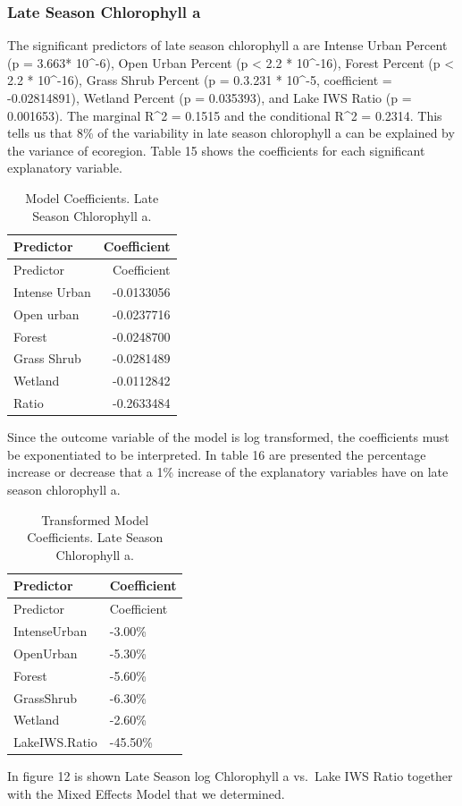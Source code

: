 \documentclass[12pt,]{article}
\begin{document}
\hypertarget{late-season-chlorophyll-a}{%
\subsubsection{Late Season Chlorophyll
a}\label{late-season-chlorophyll-a}}

The significant predictors of late season chlorophyll a are Intense
Urban Percent (p = 3.663* 10\^{}-6), Open Urban Percent (p \textless{}
2.2 * 10\^{}-16), Forest Percent (p \textless{} 2.2 * 10\^{}-16), Grass
Shrub Percent (p = 0.3.231 * 10\^{}-5, coefficient = -0.02814891),
Wetland Percent (p = 0.035393), and Lake IWS Ratio (p = 0.001653). The
marginal R\^{}2 = 0.1515 and the conditional R\^{}2 = 0.2314. This tells
us that 8\% of the variability in late season chlorophyll a can be
explained by the variance of ecoregion. Table 15 shows the coefficients
for each significant explanatory variable.

\begin{longtable}[]{@{}lr@{}}
\caption{Model Coefficients. Late Season Chlorophyll a.}\tabularnewline
\toprule
Predictor & Coefficient\tabularnewline
\midrule
\endfirsthead
\toprule
Predictor & Coefficient\tabularnewline
\midrule
\endhead
Intense Urban & -0.0133056\tabularnewline
Open urban & -0.0237716\tabularnewline
Forest & -0.0248700\tabularnewline
Grass Shrub & -0.0281489\tabularnewline
Wetland & -0.0112842\tabularnewline
Ratio & -0.2633484\tabularnewline
\bottomrule
\end{longtable}

Since the outcome variable of the model is log transformed, the
coefficients must be exponentiated to be interpreted. In table 16 are
presented the percentage increase or decrease that a 1\% increase of the
explanatory variables have on late season chlorophyll a.

\begin{longtable}[]{@{}ll@{}}
\caption{Transformed Model Coefficients. Late Season Chlorophyll
a.}\tabularnewline
\toprule
Predictor & Coefficient\tabularnewline
\midrule
\endfirsthead
\toprule
Predictor & Coefficient\tabularnewline
\midrule
\endhead
IntenseUrban & -3.00\%\tabularnewline
OpenUrban & -5.30\%\tabularnewline
Forest & -5.60\%\tabularnewline
GrassShrub & -6.30\%\tabularnewline
Wetland & -2.60\%\tabularnewline
LakeIWS.Ratio & -45.50\%\tabularnewline
\bottomrule
\end{longtable}

In figure 12 is shown Late Season log Chlorophyll a vs.~Lake IWS Ratio
together with the Mixed Effects Model that we determined.
\end{document}
